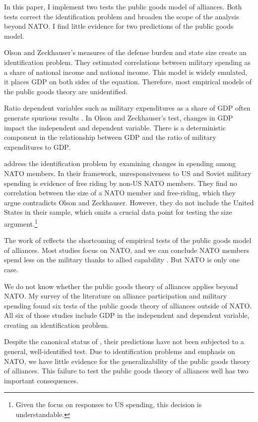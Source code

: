 \documentclass[12pt]{article}
\begin{document}
In this paper, I implement two tests the public goods model of alliances. 
Both tests correct the identification problem and broaden the scope of the analysis beyond NATO. 
I find little evidence for two predictions of the public goods model. 


Olson and Zeckhauser's measures of the defense burden and state size create an identification problem. 
They estimated correlations between military spending as a share of national income and national income.
This model is widely emulated, it places GDP on both sides of the equation.
Therefore, most empirical models of the public goods theory are unidentified.


Ratio dependent variables such as military expenditures as a share of GDP often generate spurious results \citep{Kronmal1993}. 
In Olson and Zeckhauser's test, changes in GDP impact the independent and dependent variable. 
There is a deterministic component in the relationship between GDP and the ratio of military expenditures to GDP. 


\citet{PluemperNeumayer2015} address the identification problem by examining changes in spending among NATO members. 
In their framework, unresponsiveness to US and Soviet military spending is evidence of free riding by non-US NATO members.
They find no correlation between the size of a NATO member and free-riding, which they argue contradicts Olson and Zeckhauser. 
However, they do not include the United States in their sample, which omits a crucial data point for testing the size argument.\footnote{Given the focus on responses to US spending, this decision is understandable.}


The work of \citet{PluemperNeumayer2015} reflects the shortcoming of empirical tests of the public goods model of alliances.
Most studies focus on NATO, and we can conclude NATO members spend less on the military thanks to allied capability \citep{GeorgeSandler2017}.
But NATO is only one case. 


We do not know whether the public goods theory of alliances applies beyond NATO. 
My survey of the literature on alliance participation and military spending found six tests of the public goods theory of alliances outside of NATO. 
All six of those studies include GDP in the independent and dependent variable, creating an identification problem. 


Despite the canonical status of \citet{OlsonZeckhauser1966}, their predictions have not been subjected to a general, well-identified test. 
Due to identification problems and emphasis on NATO, we have little evidence for the generalizability of the public goods theory of alliances.  
This failure to test the public goods theory of alliances well has two important consequences.
\end{document}
